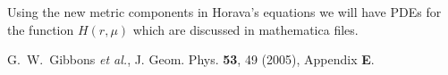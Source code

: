 \documentclass[preprint,aps,tightenlines,showkeys,nofootinbib,superscriptaddress]{revtex4}
\begin{document}
Using the new metric components in Horava's equations we will have PDEs for the function $H(r,\mu )$ which are discussed in mathematica files.
\begin{thebibliography}{999}


G.~W.~Gibbons \textit{et al.},
J. Geom. Phys. \textbf{53}, 49
(2005), Appendix {\bf E}.


\end{thebibliography}
\end{document}
